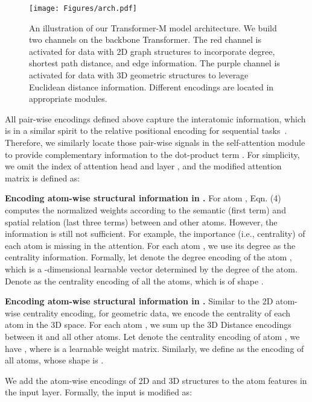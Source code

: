\documentclass{article} \usepackage[dvipsnames]{xcolor}
\begin{document}
\begin{figure}[t]
    \centering
    \texttt{[image: Figures/arch.pdf]}
    \caption{An illustration of our Transformer-M model architecture. We build two channels on the backbone Transformer. The red channel is activated for data with 2D graph structures to incorporate degree, shortest path distance, and edge information. The purple channel is activated for data with 3D geometric structures to leverage Euclidean distance information. Different encodings are located in appropriate modules. }
    \label{fig:model}
    \vspace{-6pt}
\end{figure}

 All pair-wise encodings defined above capture the interatomic information, which is in a similar spirit to the relative positional encoding for sequential tasks~\citep{raffel2019exploring}. Therefore, we similarly locate those pair-wise signals in the self-attention module to provide complementary information to the dot-product term . For simplicity, we omit the index of attention head  and layer , and the modified attention matrix is defined as:


\textbf{Encoding atom-wise structural information in . } For atom ,
Eqn. (4) computes the normalized weights according to the semantic (first term) and spatial relation (last three terms) between  and other atoms. However, the information is still not sufficient. For example, the importance (i.e., centrality) of each atom is missing in the attention. For each atom , we use its degree as the centrality information. Formally, let  denote the degree encoding of the atom , which is a -dimensional learnable vector determined by the degree of the atom. Denote  as the centrality encoding of all the atoms, which is of shape .

\textbf{Encoding atom-wise structural information in . }
Similar to the 2D atom-wise centrality encoding, for geometric data, we encode the centrality of each atom in the 3D space. For each atom , we sum up the 3D Distance encodings between it and all other atoms. Let  denote the centrality encoding of atom , we have , where  is a learnable weight matrix. Similarly, we define  as the encoding of all atoms, whose shape is .

 We add the atom-wise encodings of 2D and 3D structures to the atom features in the input layer. Formally, the input   is modified as:
\end{document}
